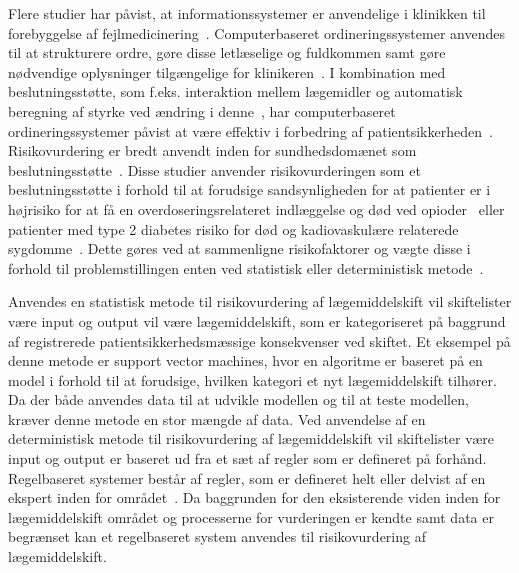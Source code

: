 Flere studier har påvist, at informationssystemer er anvendelige i klinikken til forebyggelse af fejlmedicinering~\citep{Agrawal2009, Kaushal2002, Stenner2010, Fischer2008, Simpson2008, Bates2000a}. Computerbaseret ordineringssystemer anvendes til at strukturere ordre, gøre disse letlæselige og fuldkommen samt gøre nødvendige oplysninger tilgængelige for klinikeren~\citep{Agrawal2009,Bates2000a}. I kombination med beslutningsstøtte, som f.eks. interaktion mellem lægemidler og automatisk beregning af styrke ved ændring i denne~\citep{Agrawal2009}, har computerbaseret ordineringssystemer påvist at være effektiv i forbedring af patientsikkerheden~\citep{Agrawal2009, Bates2000a}. Risikovurdering er bredt anvendt inden for sundhedsdomænet som beslutningsstøtte~\citep{Geissert2018, Rawshani2018}. Disse studier anvender risikovurderingen som et beslutningsstøtte i forhold til at forudsige sandsynligheden for at patienter er i højrisiko for at få en overdoseringsrelateret indlæggelse og død ved opioder~\citep{Geissert2018} eller patienter med type 2 diabetes risiko for død og kadiovaskulære relaterede sygdomme~\citep{Rawshani2018}. Dette gøres ved at sammenligne risikofaktorer og vægte disse i forhold til problemstillingen enten ved statistisk eller deterministisk metode~\citep{Boyko1990}.

Anvendes en statistisk metode til risikovurdering af lægemiddelskift vil skiftelister være input og output vil være lægemiddelskift, som er kategoriseret på baggrund af registrerede patientsikkerhedsmæssige konsekvenser ved skiftet. Et eksempel på denne metode er support vector machines, hvor en algoritme er baseret på en model i forhold til at forudsige, hvilken kategori et nyt lægemiddelskift tilhører. Da der både anvendes data til at udvikle modellen og til at teste modellen, kræver denne metode en stor mængde af data. Ved anvendelse af en deterministisk metode til risikovurdering af lægemiddelskift vil skiftelister være input og output er baseret ud fra et sæt af regler som er defineret på forhånd. Regelbaseret systemer består af regler, som er defineret helt eller delvist af en ekspert inden for området~\citep{Crina2008}. Da baggrunden for den eksisterende viden inden for lægemiddelskift området og processerne for vurderingen er kendte samt data er begrænset kan et regelbaseret system anvendes til risikovurdering af lægemiddelskift. 
 

